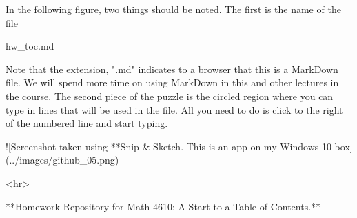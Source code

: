 In the following figure, two things should be noted. The first is the name of
the file

     hw_toc.md

Note that the extension, ".md" indicates to a browser that this is a MarkDown
file. We will spend more time on using MarkDown in this and other lectures in
the course. The second piece of the puzzle is the circled region where you can
type in lines that will be used in the file. All you need to do is click to the
right of the numbered line and start typing.

![Screenshot taken using **Snip & Sketch. This is an app on my Windows 10 box](../images/github_05.png)

<hr>

**Homework Repository for Math 4610: A Start to a Table of Contents.** 

